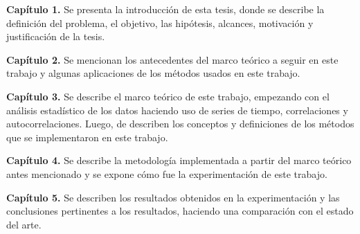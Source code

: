 \begin{description}
\item \textbf{Capítulo 1.} Se presenta la introducción de esta tesis, donde se describe la definición del problema, el objetivo, las hipótesis, alcances, motivación y justificación de la tesis. 
\item \textbf{Capítulo 2.} Se mencionan los antecedentes del marco teórico a seguir en este trabajo y algunas aplicaciones de los métodos usados en este trabajo.
\item \textbf{Capítulo 3.} Se describe el marco teórico de este trabajo, empezando con el análisis estadístico de los datos haciendo uso de series de tiempo, correlaciones y autocorrelaciones. Luego, de describen los conceptos y definiciones de los métodos que se implementaron en este trabajo.
\item \textbf{Capítulo 4.} Se describe la metodología implementada a partir del marco teórico antes mencionado y se expone cómo fue la experimentación de este trabajo.
 \item \textbf{Capítulo 5.} Se describen los resultados obtenidos en la experimentación y las conclusiones pertinentes a los resultados, haciendo una comparación con el estado del arte.
\end{description}






